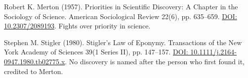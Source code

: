 \documentclass[11pt,twoside]{article}
\theoremstyle{thielethm}
\theoremstyle{thieledef}
\theoremstyle{thieledef}
\theoremstyle{thieledef}
\theoremstyle{thielethm}
\theoremstyle{thieleobs}
\theoremstyle{thielethm}
\begin{document}
\noindent Robert K. Merton (1957). Priorities in Scientific Discovery: A Chapter in the Sociology of Science. American Sociological Review 22(6), pp. 635--659. \href{https://doi.org/10.2307/2089193}{DOI: 10.2307/2089193}. Fights over priority in science.
\par\medskip

\noindent Stephen M. Stigler (1980). Stigler's Law of Eponymy. Transactions of the New York Academy of Sciences 39(1 Series II), pp. 147--157. \href{https://doi.org/10.1111/j.2164-0947.1980.tb02775.x}{DOI: 10.1111/j.2164-0947.1980.tb02775.x}. No discovery is named after the person who first found it, credited to Merton.
\par\medskip
\end{document}
